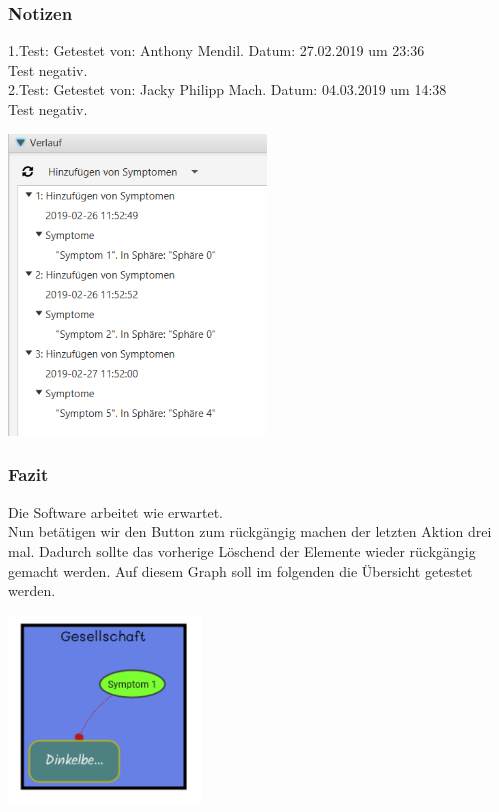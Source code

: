 \documentclass[enabledeprecatedfontcommands]{scrartcl}
\begin{document}
\subsubsection{Notizen}
1.Test: Getestet von: Anthony Mendil. Datum: 27.02.2019 um 23:36 \\
Test negativ. \\
2.Test: Getestet von: Jacky Philipp Mach. Datum: 04.03.2019 um 14:38 \\
Test negativ.
\begin{center}
\includegraphics[height=8cm]{verlaufUpdateButton.PNG}
\end{center}
\subsubsection{Fazit}
Die Software arbeitet wie erwartet.\\

Nun betätigen wir den Button zum rückgängig machen der letzten Aktion drei mal. Dadurch sollte das vorherige Löschend der Elemente wieder rückgängig gemacht werden. Auf diesem Graph soll im folgenden die Übersicht getestet werden.
\begin{center}
\includegraphics[height=5cm]{graphFuerUebersicht.PNG}
\end{center}
\end{document}
